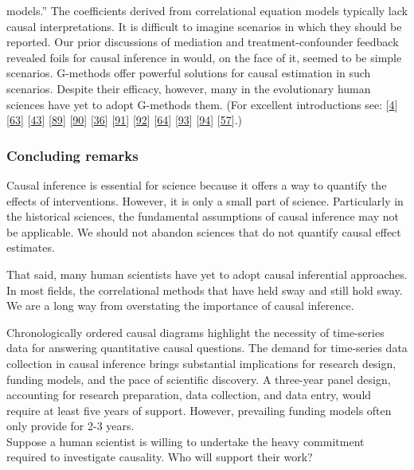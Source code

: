 \documentclass[
  singlecolumn]{article}
\begin{document}
\begin{enumerate}
  models.'' The coefficients derived from correlational equation models
  typically lack causal interpretations. It is difficult to imagine
  scenarios in which they should be reported. Our prior discussions of
  mediation and treatment-confounder feedback revealed foils for causal
  inference in would, on the face of it, seemed to be simple scenarios.
  G-methods offer powerful solutions for causal estimation in such
  scenarios. Despite their efficacy, however, many in the evolutionary
  human sciences have yet to adopt G-methods them. (For excellent
  introductions see: {[}\protect\hyperlink{ref-hernuxe1n2023}{4}{]}
  {[}\protect\hyperlink{ref-duxedaz2021}{63}{]}
  {[}\protect\hyperlink{ref-vanderweele2015}{43}{]}
  {[}\protect\hyperlink{ref-hoffman2022}{89}{]}
  {[}\protect\hyperlink{ref-hoffman2023}{90}{]}
  {[}\protect\hyperlink{ref-chatton2020}{36}{]}
  {[}\protect\hyperlink{ref-shiba2021}{91}{]}
  {[}\protect\hyperlink{ref-sjuxf6lander2016}{92}{]}
  {[}\protect\hyperlink{ref-breskin2020}{64}{]}
  {[}\protect\hyperlink{ref-vanderweele2009a}{93}{]}
  {[}\protect\hyperlink{ref-vansteelandt2012}{94}{]}
  {[}\protect\hyperlink{ref-shi2021}{57}{]}.)
\end{enumerate}

\hypertarget{concluding-remarks}{%
\subsubsection{Concluding remarks}\label{concluding-remarks}}

Causal inference is essential for science because it offers a way to
quantify the effects of interventions. However, it is only a small part
of science. Particularly in the historical sciences, the fundamental
assumptions of causal inference may not be applicable. We should not
abandon sciences that do not quantify causal effect estimates.

That said, many human scientists have yet to adopt causal inferential
approaches. In most fields, the correlational methods that have held
sway and still hold sway. We are a long way from overstating the
importance of causal inference.

Chronologically ordered causal diagrams highlight the necessity of
time-series data for answering quantitative causal questions. The demand
for time-series data collection in causal inference brings substantial
implications for research design, funding models, and the pace of
scientific discovery. A three-year panel design, accounting for research
preparation, data collection, and data entry, would require at least
five years of support. However, prevailing funding models often only
provide for 2-3 years.\\
Suppose a human scientist is willing to undertake the heavy commitment
required to investigate causality. Who will support their work?
\end{document}

